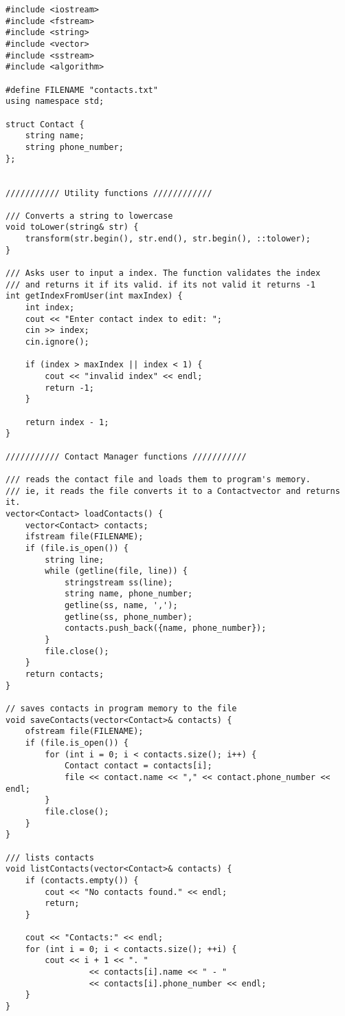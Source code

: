 \documentclass[12pt, a4paper]{article}
\begin{document}
\renewcommand{\theFancyVerbLine}{\textcolor[rgb]{0.5,0.5,1.0}{\scriptsize \arabic{FancyVerbLine}}}
\begin{verbatim}
#include <iostream>
#include <fstream>
#include <string>
#include <vector>
#include <sstream>
#include <algorithm>

#define FILENAME "contacts.txt"
using namespace std;

struct Contact {
	string name;
	string phone_number;
};


/////////// Utility functions ////////////

/// Converts a string to lowercase
void toLower(string& str) {
	transform(str.begin(), str.end(), str.begin(), ::tolower);
}

/// Asks user to input a index. The function validates the index
/// and returns it if its valid. if its not valid it returns -1
int getIndexFromUser(int maxIndex) {
	int index;
	cout << "Enter contact index to edit: ";
	cin >> index;
	cin.ignore();
	
	if (index > maxIndex || index < 1) {
		cout << "invalid index" << endl;
		return -1;
	}

	return index - 1;
}

/////////// Contact Manager functions ///////////

/// reads the contact file and loads them to program's memory.
/// ie, it reads the file converts it to a Contactvector and returns it.
vector<Contact> loadContacts() {
	vector<Contact> contacts;
	ifstream file(FILENAME);
	if (file.is_open()) {
		string line;
		while (getline(file, line)) {
			stringstream ss(line);
			string name, phone_number;
			getline(ss, name, ',');
			getline(ss, phone_number);
			contacts.push_back({name, phone_number});
		}
		file.close();
	}
	return contacts;
}

// saves contacts in program memory to the file
void saveContacts(vector<Contact>& contacts) {
	ofstream file(FILENAME);
	if (file.is_open()) {
		for (int i = 0; i < contacts.size(); i++) {
			Contact contact = contacts[i];
			file << contact.name << "," << contact.phone_number << endl;
		}
		file.close();
	}
}

/// lists contacts
void listContacts(vector<Contact>& contacts) {
	if (contacts.empty()) {
		cout << "No contacts found." << endl;
		return;
	}

	cout << "Contacts:" << endl;
	for (int i = 0; i < contacts.size(); ++i) {
		cout << i + 1 << ". "
				 << contacts[i].name << " - "
				 << contacts[i].phone_number << endl;
	}
}


\end{verbatim}
\end{document}

